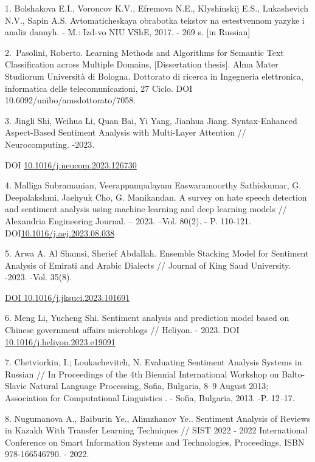 \begin{references}
1. Bolshakova E.I., Voroncov K.V., Efremova N.E., Klyshinskij E.S.,
Lukashevich N.V., Sapin A.S. Avtomaticheskaya obrabotka tekstov na
estestvennom yazyke i analiz dannyh. - M.: Izd-vo NIU VShE, 2017. - 269
s. {[}in Russian{]}

2.~Pasolini, Roberto. Learning Methods and Algorithms for Semantic Text
Classification across Multiple Domains, {[}Dissertation thesis{]}. Alma
Mater Studiorum Università di Bologna. Dottorato di ricerca in
Ingegneria elettronica, informatica delle telecomunicazioni, 27 Ciclo.
DOI 10.6092/unibo/amsdottorato/7058.

3. Jingli Shi, Weihua Li, Quan Bai, Yi Yang, Jianhua Jiang.
Syntax-Enhanced Aspect-Based Sentiment Analysis with Multi-Layer
Attention // Neurocomputing. -2023.

DOI
\href{https://doi.org/10.1016/j.neucom.2023.126730}{10.1016/j.neucom.2023.126730}

4. Malliga Subramanian, Veerappampalayam Easwaramoorthy Sathiskumar, G.
Deepalakshmi, Jaehyuk Cho, G. Manikandan. A survey on hate speech
detection and sentiment analysis using machine learning and deep
learning models // Alexandria Engineering Journal. -- 2023. --Vol.
80(2). - P. 110-121.
DOI\href{http://dx.doi.org/10.1016/j.aej.2023.08.038}{10.1016/j.aej.2023.08.038}

5. Arwa A. Al Shamsi, Sherief Abdallah. Ensemble Stacking Model for
Sentiment Analysis of Emirati and Arabic Dialects // Journal of King
Saud University. -2023. -Vol. 35(8).

\href{https://doi.org/10.1016/j.jksuci.2023.101691}{DOI
10.1016/j.jksuci.2023.101691}

6. Meng Li, Yucheng Shi. Sentiment analysis and prediction model based
on Chinese government affairs microblogs // Heliyon. - 2023. DOI
\href{https://doi.org/10.1016/j.heliyon.2023.e19091}{10.1016/j.heliyon.2023.e19091}

7. Chetviorkin, I.; Loukachevitch, N. Evaluating Sentiment Analysis
Systems in Russian // In Proceedings of the 4th Biennial International
Workshop on Balto-Slavic Natural Language Processing, Sofia, Bulgaria,
8--9 August 2013; Association for Computational Linguistics . - Sofia,
Bulgaria, 2013. -P. 12--17.

8. Nugumanova A., Baiburin Ye., Alimzhanov Ye.. Sentiment Analysis of
Reviews in Kazakh With Transfer Learning Techniques // SIST 2022 - 2022
International Conference on Smart Information Systems and Technologies,
Proceedings, ISBN 978-166546790. - 2022.


\end{references}
